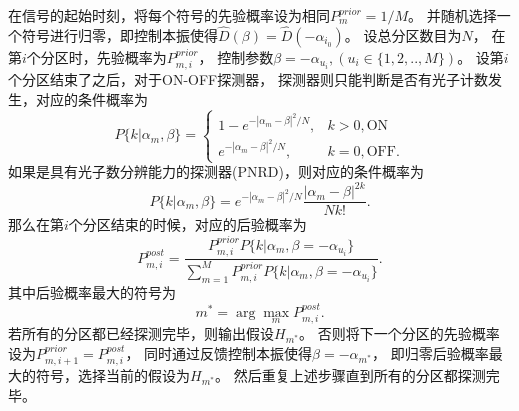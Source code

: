 在信号的起始时刻，将每个符号的先验概率设为相同$P_m^{prior} = 1/M$。
并随机选择一个符号进行归零，即控制本振使得$\hat{D}(\beta)=\hat{D}(-\alpha_{i_0})$。
设总分区数目为$N$，
在第$i$个分区时，先验概率为$P_{m,i}^{prior}$，
控制参数$\beta = -\alpha_{u_i},(u_i \in \{1,2,..,M\})$。
设第$i$个分区结束了之后，对于ON-OFF探测器，
探测器则只能判断是否有光子计数发生，对应的条件概率为
\begin{equation}
P\{k|\alpha_m, \beta\} = \begin{cases}
                        1 - e^{-|\alpha_m - \beta|^2/N}, & k>0, \text{ON}\\
                        e^{-|\alpha_m - \beta|^2/N},     & k=0, \text{OFF}.
                       \end{cases}
\end{equation}
如果是具有光子数分辨能力的探测器(PNRD)，则对应的条件概率为
\begin{equation}
P\{k|\alpha_m, \beta\} = e^{-|\alpha_m - \beta|^2/N} \frac{|\alpha_m - \beta|^{2k}}{N k!}.
\label{eq:QAM-ADP-cond-prob}
\end{equation}
那么在第$i$个分区结束的时候，对应的后验概率为
\begin{equation}
P_{m,i}^{post} = \frac{P_{m,i}^{prior} P\{k|\alpha_m, \beta=-\alpha_{u_i}\}}{\sum_{m=1}^M P_{m,i}^{prior} P\{k|\alpha_m, \beta=-\alpha_{u_i}\}}.
\label{eq:QAM-ADP-post-prob}
\end{equation}
其中后验概率最大的符号为
\begin{equation}
m^* = \arg\max_m P_{m,i}^{post}.
\end{equation}
若所有的分区都已经探测完毕，则输出假设$H_{m^*}$。
否则将下一个分区的先验概率设为$P_{m,i+1}^{prior} = P_{m,i}^{post}$，
同时通过反馈控制本振使得$\beta = -\alpha_{m^*}$，
即归零后验概率最大的符号，选择当前的假设为$H_{m^*}$。
然后重复上述步骤直到所有的分区都探测完毕。




